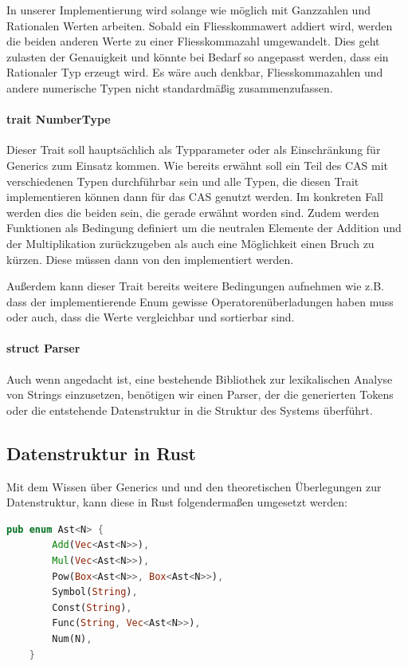 \documentclass[11pt,a4paper, ngerman]{article}
\begin{document}
In unserer Implementierung wird  solange wie möglich mit Ganzzahlen und Rationalen Werten arbeiten. Sobald ein Fliesskommawert addiert wird, werden die beiden anderen Werte zu einer Fliesskommazahl umgewandelt. Dies geht zulasten der Genauigkeit und könnte bei Bedarf so angepasst werden, dass ein Rationaler Typ erzeugt wird. Es wäre auch denkbar, Fliesskommazahlen und andere numerische Typen nicht standardmäßig zusammenzufassen.

\paragraph{trait NumberType} Dieser Trait soll hauptsächlich als Typparameter oder als Einschränkung für Generics zum Einsatz kommen. Wie bereits erwähnt soll ein Teil des CAS mit verschiedenen Typen durchführbar sein und alle Typen, die diesen Trait implementieren können dann für das CAS genutzt werden. Im konkreten Fall werden dies die beiden  sein, die gerade erwähnt worden sind. Zudem werden Funktionen als Bedingung definiert um die neutralen Elemente der Addition und der Multiplikation zurückzugeben als auch eine Möglichkeit einen Bruch zu kürzen. Diese müssen dann von den  implementiert werden.

Außerdem kann dieser Trait bereits weitere Bedingungen aufnehmen wie z.B. dass der implementierende Enum gewisse Operatorenüberladungen haben muss oder auch, dass die Werte vergleichbar und sortierbar sind.

\paragraph{struct Parser} Auch wenn angedacht ist, eine bestehende Bibliothek zur lexikalischen Analyse von Strings einzusetzen, benötigen wir einen Parser, der die generierten Tokens oder die entstehende Datenstruktur in die Struktur des Systems überführt.

\subsection{Datenstruktur in Rust}
Mit dem Wissen über Generics und und den theoretischen Überlegungen zur Datenstruktur, kann diese in Rust folgendermaßen umgesetzt werden:
\begin{lstlisting}[language=rust, caption={Datenstruktur in Rust}]
    pub enum Ast<N> {
        Add(Vec<Ast<N>>),
        Mul(Vec<Ast<N>>),
        Pow(Box<Ast<N>>, Box<Ast<N>>),
        Symbol(String),
        Const(String),
        Func(String, Vec<Ast<N>>),
        Num(N),
    }
\end{lstlisting}
\end{document}
